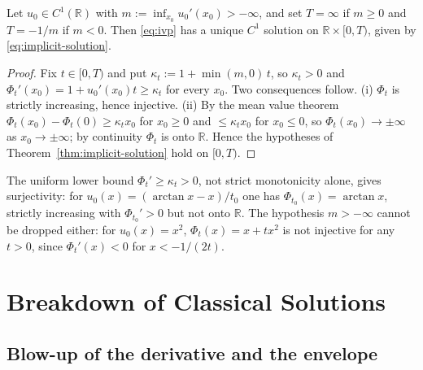 \begin{corollary}
\label{cor:local-existence}
Let $u_0 \in C^1(\mathbb{R})$ with $m := \inf_{x_0} u_0'(x_0) > -\infty$,
and set $T=\infty$ if $m\ge0$ and $T=-1/m$ if $m<0$. Then
\eqref{eq:ivp} has a unique $C^1$ solution on $\mathbb{R}\times[0,T)$,
given by \eqref{eq:implicit-solution}.
\end{corollary}

\begin{proof}
Fix $t\in[0,T)$ and put $\kappa_t := 1+\min(m,0)\,t$, so $\kappa_t>0$ and
$\Phi_t'(x_0)=1+u_0'(x_0)t\ge \kappa_t$ for every $x_0$. Two consequences
follow. (i) $\Phi_t$ is strictly increasing, hence injective. (ii) By the
mean value theorem $\Phi_t(x_0)-\Phi_t(0)\ge \kappa_t x_0$ for $x_0\ge0$ and
$\le \kappa_t x_0$ for $x_0\le0$, so $\Phi_t(x_0)\to\pm\infty$ as
$x_0\to\pm\infty$; by continuity $\Phi_t$ is onto $\mathbb{R}$.
Hence the hypotheses of Theorem~\ref{thm:implicit-solution} hold on
$[0,T)$.
\end{proof}

\begin{remark}
\label{rem:hypothesis-u0prime}
The uniform lower bound $\Phi_t'\ge \kappa_t>0$, not strict monotonicity alone,
gives surjectivity: for $u_0(x)=(\arctan x-x)/t_0$ one has $\Phi_{t_0}(x)=\arctan x$,
strictly increasing with $\Phi_{t_0}'>0$ but not onto $\mathbb{R}$. The
hypothesis $m>-\infty$ cannot be dropped either: for $u_0(x)=x^2$,
$\Phi_t(x)=x+tx^2$ is not injective for any $t>0$, since $\Phi_t'(x)<0$ for
$x<-1/(2t)$.
\end{remark}


\section{Breakdown of Classical Solutions}
\label{sec:shock-formation}

\subsection{Blow-up of the derivative and the envelope}
\label{subsec:shock-derivative-blowup}

